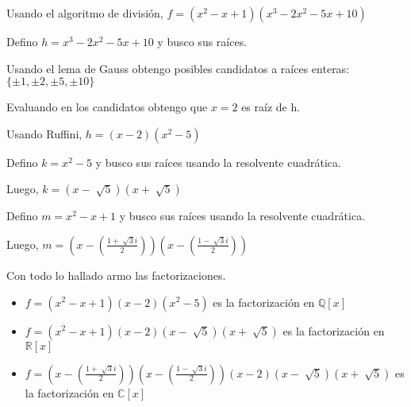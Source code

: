 Usando el algoritmo de división, $ f = (x^2-x+1)(x^3-2x^2-5x+10) $

Defino $ h = x^3-2x^2-5x+10 $ y busco sus raíces.

Usando el lema de Gauss obtengo posibles candidatos a raíces enteras: $ \{ \pm 1, \pm 2, \pm 5, \pm 10 \} $

Evaluando en los candidatos obtengo que $ x = 2 $ es raíz de h.

Usando Ruffini, $ h = (x-2)(x^2-5) $

Defino $ k = x^2 - 5 $ y busco sus raíces usando la resolvente cuadrática.

Luego, $ k = (x-\sqrt[]{5})(x+\sqrt[]{5}) $

Defino $ m = x^2-x+1 $ y busco sus raíces usando la resolvente cuadrática.

Luego, $ m = (x-(\frac{1+\sqrt[]{3}i}{2}))(x-(\frac{1-\sqrt[]{3}i}{2})) $

Con todo lo hallado armo las factorizaciones.

\begin{itemize}
    \item $ f = (x^2-x+1)(x-2)(x^2-5) $ es la factorización en $ \mathbb{Q}[x] $
    \item $ f = (x^2-x+1)(x-2)(x-\sqrt[]{5})(x+\sqrt[]{5}) $ es la factorización en $ \mathbb{R}[x] $
    \item $ f = (x-(\frac{1+\sqrt[]{3}i}{2}))(x-(\frac{1-\sqrt[]{3}i}{2}))(x-2)(x-\sqrt[]{5})(x+\sqrt[]{5}) $ es la factorización en $ \mathbb{C}[x] $
\end{itemize}


